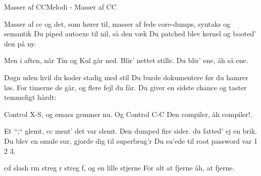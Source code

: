 \begin{sang}{Masser af CC}{Melodi - Masser af CC}
\begin{vers}
Masser af cc
og det, som hører til,
masser af fede core-dumps,
syntaks og semantik
Du piped autoexe
til nil, så den væk
Du patched blev kernel
og booted' den på ny.
\end{vers}
\begin{vers}
Men i aften, når Tin og Kul går ned.
Blir' nettet stille.
Du blir' ene, åh så ene.
\end{vers}
\begin{vers}
Døgn uden hvil
du koder stadig med stil
Du burde dokumentere
før du hamrer løs.
For timerne de går,
og flere fejl du får.
Du giver en sidste chance
og taster temmeligt hårdt:
\end{vers}
\vbox{}\vfill
\vspace{-1cm}
\begin{vers}
Control X-S, og emacs gemmer nu.
Og Control C-C
Den compiler, åh compiler!.
\end{vers}

\begin{vers}
Et “;“ glemt,
cc ment' det var slemt.
Den dumped fire sider.
du fatted' ej en brik.
Du blev en smule sur,
gjorde dig til superbrug'r
Du su'ede til root
password var 1 2 3.
\end{vers}
\begin{vers}
cd slash rm streg r streg f,
og en lille stjerne
For alt at fjerne
åh, at fjerne. 
\end{vers}
\vbox{}\vfill
\laps
\end{sang}